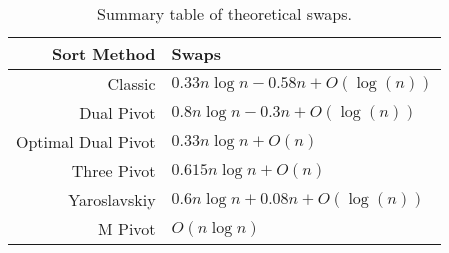 		\begin{table}
			\begin{center}
				\begin{tabular}{|r|l|}
					\hline
					Sort Method         &     Swaps \\ \hline \hline
					Classic             &  $0.33n \log n - 0.58n + O(\log(n))$ \\ \hline
					Dual Pivot          &  $0.8n \log n -0.3n + O(\log(n))$    \\ \hline
					Optimal Dual Pivot  &  $0.33n \log n + O(n)$               \\ \hline
					Three Pivot         &  $0.615n \log n + O(n)$              \\ \hline
					Yaroslavskiy        &  $0.6n \log n + 0.08n + O(\log(n))$  \\ \hline
					M Pivot             &  $O(n \log n)$                       \\ \hline
				\end{tabular}
				\caption{Summary table of theoretical swaps.}
				\label{tab:SwapSummary}
			\end{center}
		\end{table}